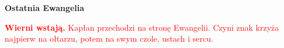 \begin{Parallel}[v]{0.485\textwidth}{0.485\textwidth}

\end{Parallel}

\begin{center}
\textbf{Ostatnia Ewangelia}
\end{center}

\begin{center}
\textcolor{red}{\textbf{Wierni wstają.} Kapłan przechodzi na stronę Ewangelii. Czyni znak krzyża najpierw na ołtarzu, potem na swym czole, ustach i sercu.}
\end{center}

